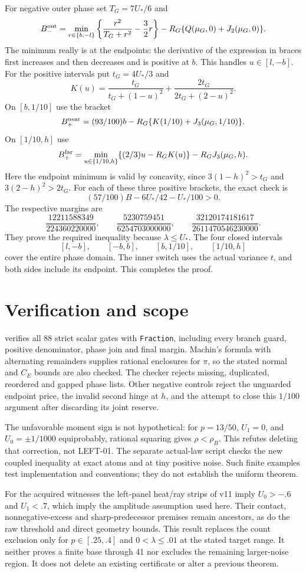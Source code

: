 \documentclass[11pt]{article}
\begin{document}
For negative outer phase set $T_G=7U_*/6$ and
\[
 B_-^{\rm out}=
 \min_{r\in\{b,-l\}}\left\{\frac{r^2}{T_G+r^2}-\frac32r\right\}
           -R_G\{Q(\mu_G,0)+J_2(\mu_G,0)\}.
\]
The minimum really is at the endpoints: the derivative of the expression
in braces first increases and then decreases and is positive at $b$.
This handles $u\in[l,-b]$.
For the positive intervals put $t_G=4U_*/3$ and
\[
 K(u)=\frac{t_G}{t_G+(1-u)^2}+
                  \frac{2t_G}{2t_G+(2-u)^2}.
\]
On $[b,1/10]$ use the bracket
\[
 B_+^{\rm near}=(93/100)b-R_G\{K(1/10)+J_3(\mu_G,1/10)\}.
\]
On $[1/10,h]$ use
\[
 B_+^{\rm far}=\min_{u\in\{1/10,h\}}
                   \{(2/3)u-R_GK(u)\}-R_GJ_3(\mu_G,h).
\]
Here the endpoint minimum is valid by concavity, since
$3(1-h)^2>t_G$ and $3(2-h)^2>2t_G$.
For each of these three positive brackets, the exact check is
\[
                 (57/100)B-6U_*/42-U_*/100>0.
\]
The respective margins are
\[
 \frac{12211588349}{224360220000},\qquad
 \frac{5230759451}{6254703000000},\qquad
 \frac{32120174181617}{2611470546230000}.
\]
They prove the required inequality because $\lambda\le U_*$.
The four closed intervals
\[
 [l,-b],\qquad [-b,b],\qquad [b,1/10],\qquad [1/10,h]
\]
cover the entire phase domain. The inner switch uses the actual variance $t$,
and both sides include its endpoint. This completes the proof.

\section*{Verification and scope}
 verifies all 88 strict scalar gates with
\texttt{Fraction}, including every branch guard, positive denominator,
phase join and final margin. Machin's formula with alternating remainders
supplies rational enclosures for $\pi$, so the stated normal and $C_E$
bounds are also checked. The checker rejects missing, duplicated, reordered
and gapped phase lists. Other negative controls reject the unguarded
endpoint price, the invalid second hinge at $h$, and the attempt to close
this $1/100$ argument after discarding its joint reserve.

The unfavorable moment sign is not hypothetical: for $p=13/50$,
$U_1=0$, and $U_0=\pm1/1000$ equiprobably, rational squaring gives
$\rho<\rho_B$. This refutes deleting that correction, not LEFT-01.
The separate actual-law script checks the new coupled inequality at exact
atoms and at tiny positive noise. Such finite examples test implementation
and conventions; they do not establish the uniform theorem.

For the acquired witnesses the left-panel heat/ray strips of v11 imply
$U_0>-.6$ and $U_1<.7$, which imply the amplitude assumption used here.
Their contact, nonnegative-excess and sharp-predecessor premises remain
ancestors, as do the raw threshold and direct geometry bounds. This result
replaces the count exclusion only for $p\in[.25,.4]$ and
$0<\lambda\le.01$ at the stated target range. It neither proves a
finite base through 41 nor excludes the remaining larger-noise region.
It does not delete an existing certificate or alter a previous theorem.
\end{document}
